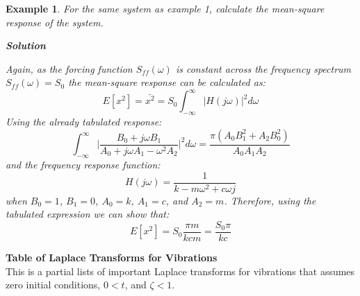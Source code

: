 \documentclass[12pt,letter]{article}
\newtheorem{ex}{Example}
\numberwithin{ex}{section} %
\newenvironment{example}{\begin{mdframed}[middlelinewidth=0.5mm]\begin{ex}\normalfont}{\end{ex}\end{mdframed}}
\begin{document}
\begin{example}



For the same system as example 1, calculate the mean-square response of the system. 

\textbf{Solution}

Again, as the forcing function $S_{ff}(\omega)$ is constant across the frequency spectrum $S_{ff}(\omega)=S_0$ the mean-square response can be calculated as:
\begin{equation}
E[x^2] = \bar{x^2} =   S_{0} \int_{-\infty}^{\infty} |H(j\omega)|^2 d\omega
\end{equation}
Using the already tabulated response:
\begin{equation}
\int_{-\infty}^{\infty} \bigg|\frac{B_0 + j \omega B_1}{A_0+j \omega A_1 - \omega^2 A_2} \bigg|^2 d\omega = \frac{\pi (A_0 B_1^2 + A_2 B_0^2)}{A_0 A_1 A_2}
\end{equation} 
and the frequency response function:
\begin{equation}
H(j\omega) = \frac{1}{k-m\omega^2+c\omega j}
\end{equation}
when $B_0=1$, $B_1 = 0$, $A_0=k$, $A_1=c$, and $A_2 =m$. Therefore, using the tabulated expression we can show that:
\begin{equation}
E[x^2] = S_0 \frac{\pi m }{k c m} =  \frac{S_0 \pi}{k c}
\end{equation} 

\end{example}			
			
\pagebreak			
			\pagestyle{empty}
			\vspace{-25ex}
			\begin{center}
			{\large{}\textbf{Table of Laplace Transforms for Vibrations}} \\
			\normalsize{} This is a partial lists of important Laplace transforms for vibrations that assumes \\ zero initial conditions, $0 < t$, and $\zeta < 1$.
			\end{center}
			
\end{document}
